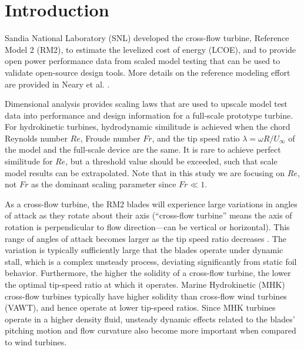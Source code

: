 \documentclass[12pt,letterpaper]{scrreprt}
\begin{document}
\tableofcontents

\newpage
\listoftodos

\chapter{Introduction}

Sandia National Laboratory (SNL) developed the cross-flow turbine, Reference
Model 2 (RM2), to estimate the levelized cost of energy (LCOE), and to provide
open power performance data from scaled model testing that can be used to
validate open-source design tools.  More details on the reference modeling
effort are provided in Neary et al. \cite{Neary2014}.

Dimensional analysis provides scaling laws that are used to upscale model test
data into performance and design information for a full-scale prototype turbine.
For hydrokinetic turbines, hydrodynamic similitude is achieved when the chord
Reynolds number $Re$, Froude number $Fr$, and the tip speed ratio
$\lambda=\omega R/U_\infty$ of the model and the full-scale device are the same.
It is rare to achieve perfect similitude for $Re$, but a threshold value should
be exceeded, such that scale model results can be extrapolated. Note that in
this study we are focusing on $Re$, not $Fr$ as the dominant scaling parameter
since $Fr \ll 1$.


As a cross-flow turbine, the RM2 blades will experience large variations in
angles of attack as they rotate about their axis (``cross-flow turbine'' means
the axis of rotation is perpendicular to flow direction---can be vertical or
horizontal). This range of angles of attack becomes larger as the tip speed
ratio decreases \cite{Para2002}. The variation is typically sufficiently large
that the blades operate under dynamic stall, which is a complex unsteady
process, deviating significantly from static foil behavior. Furthermore, the
higher the solidity of a cross-flow turbine, the lower the optimal tip-speed
ratio at which it operates. Marine Hydrokinetic (MHK) cross-flow turbines
typically have higher solidity than cross-flow wind turbines (VAWT), and hence
operate at lower tip-speed ratios. Since MHK turbines operate in a higher
density fluid, unsteady dynamic effects related to the blades' pitching motion
and flow curvature also become more important when compared to wind turbines.
\end{document}
